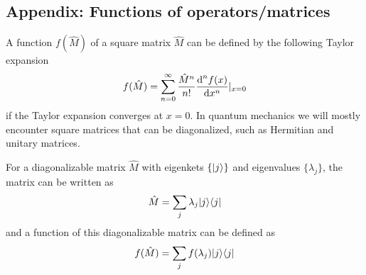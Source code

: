 \subsection{Appendix: Functions of operators/matrices}
\label{app:function of matrices}

A function $f(\hat M)$ of a square matrix $\hat M$ can be defined by the following Taylor expansion
\begin{align}
f(\hat M)=\sum_{n=0}^\infty\frac{\hat M^n}{n!}\frac{\text{d}^nf(x)}{\mathrm{d}{x}^n}|_{x=0}
\end{align}
if the Taylor expansion converges at $x=0$. In quantum mechanics we will mostly encounter square matrices that can be diagonalized, such as Hermitian and unitary matrices. 

For a diagonalizable matrix $\hat M$ with eigenkets $\{|{j}\rangle\}$ and eigenvalues $\{\lambda_j\}$, the matrix can be written as
\begin{align}
\hat M=\sum_j\lambda_j|{j}\rangle\langle{j}|
\end{align}
and a function of this diagonalizable matrix can be defined as
\begin{align}
f(\hat M)=\sum_jf(\lambda_j)|{j}\rangle\langle{j}|
\end{align}